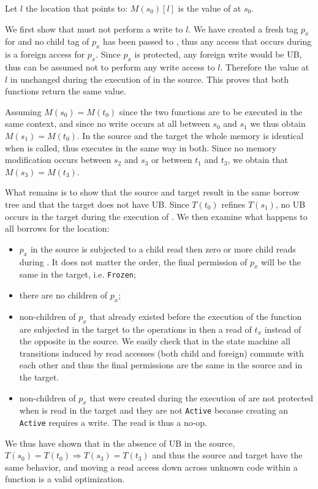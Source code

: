 \documentclass[a4paper,11pt]{article}
\theoremstyle{plain}
\theoremstyle{definition}
\theoremstyle{remark}
\newcommand{\tcode}[1]{\rstinline{#1}}
\newcommand{\tperm}[1]{\texttt{#1}}
\begin{document}
Let \(l\) the location that \tcode{x} points to: \(M(s_0)[l]\) is the value
of \tcode{*x} at \(s_0\).

We first show that \tcode{g} must not perform a write to \(l\). We have created
a fresh tag \(p_x\) for \tcode{x} and no child tag of \(p_x\) has been passed
to \tcode{g}, thus any access that occurs during \tcode{g} is a foreign access
for \(p_x\). Since \(p_x\) is protected, any foreign write would be UB, thus
\tcode{g} can be assumed not to perform any write access to \(l\).
Therefore the value at \(l\) in unchanged during the execution of \tcode{g} in
the source. This proves that both functions return the same value.

Assuming \(M(s_0) = M(t_0)\) since the two functions are to be executed in the
same context, and since no write occurs at all between \(s_0\) and \(s_1\)
we thus obtain \(M(s_1) = M(t_0)\). In the source and the target the whole memory
is identical when \tcode{g} is called, thus \tcode{g} executes in the same way
in both. Since no memory modification occurs between \(s_2\) and \(s_3\) or between
\(t_1\) and \(t_3\), we obtain that \(M(s_3) = M(t_3)\).

What remains is to show that the source and target result in the same
borrow tree and that the target does not have UB. Since \(T(t_0)\) refines
\(T(s_1)\), no UB occurs in the target during the execution of \tcode{g}.
We then examine what happens to all borrows for the location:
\begin{itemize}
    \item \(p_x\) in the source is subjected to a child read then zero or more
        child reads during \tcode{g}. It does not matter the order, the final
        permission of \(p_x\) will be the same in the target, i.e. \tperm{Frozen};
    \item there are no children of \(p_x\);
    \item non-children of \(p_x\) that already existed before the execution
        of the function are subjected in the target to the operations in \tcode{g}
        then a read of \(t_x\) instead of the opposite in the source. We easily
        check that in the state machine all transitions induced by read accesses
        (both child and foreign) commute with each other and thus the final
        permissions are the same in the source and in the target.
    \item non-children of \(p_x\) that were created during the execution of \tcode{g}
        are not protected when \tcode{*x} is read in the target and they are not
        \tperm{Active} because creating an \tperm{Active} requires a write.
        The read is thus a no-op.
\end{itemize}

We thus have shown that in the absence of UB in the source,
\(T(s_0) = T(t_0) \Longrightarrow T(s_3) = T(t_3)\) and
thus the source and target have the same behavior, and moving a read access
down across unknown code within a function is a valid optimization.






\newpage
\appendix
\end{document}
